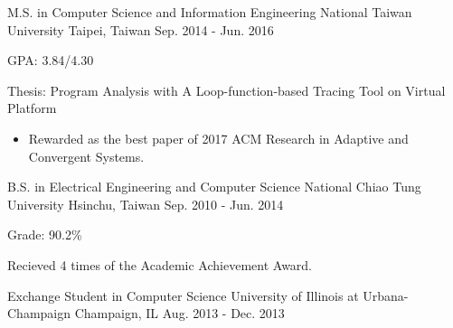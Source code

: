 

\begin{cventries}

  \cventry
    {M.S. in Computer Science and Information Engineering} %
    {National Taiwan University} %
    {Taipei, Taiwan} %
    {Sep. 2014 - Jun. 2016} %
    {
      \begin{cvitems} %
        \item {GPA: 3.84/4.30}
        \item {Thesis: Program Analysis with A Loop-function-based Tracing Tool
          on Virtual Platform}
          \begin{itemize}
            \item Rewarded as the best paper of 2017 ACM Research in Adaptive and Convergent Systems.
          \end{itemize}
      \end{cvitems}
    }

  \cventry
    {B.S. in Electrical Engineering and Computer Science} %
    {National Chiao Tung University} %
    {Hsinchu, Taiwan} %
    {Sep. 2010 - Jun. 2014} %
    {
      \begin{cvitems} %
        \item {Grade: 90.2\%}
        \item {Recieved 4 times of the Academic Achievement Award.}
      \end{cvitems}
    }

  \cventry
    {Exchange Student in Computer Science} %
    {University of Illinois at Urbana-Champaign} %
    {Champaign, IL} %
    {Aug. 2013 - Dec. 2013} %
    {
    }

\end{cventries}
